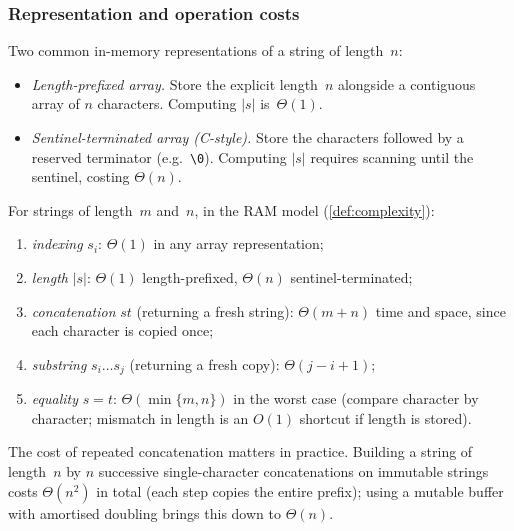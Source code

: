 \subsubsection*{Representation and operation costs}

Two common in-memory representations of a string of length~$n$:
\begin{itemize}
  \item \emph{Length-prefixed array.} Store the explicit length~$n$
        alongside a contiguous array of $n$ characters. Computing
        $|s|$ is~$\Theta(1)$.
  \item \emph{Sentinel-terminated array (C-style).} Store the
        characters followed by a reserved terminator (e.g.\ \texttt{\textbackslash 0}).
        Computing $|s|$ requires scanning until the sentinel, costing
        $\Theta(n)$.
\end{itemize}

\begin{proposition}
\label{prop:string-ops-cost}
For strings of length~$m$ and~$n$, in the RAM model
(\cref{def:complexity}):
\begin{enumerate}[label=(\alph*)]
  \item \emph{indexing} $s_i$: $\Theta(1)$ in any array representation;
  \item \emph{length} $|s|$: $\Theta(1)$ length-prefixed,
        $\Theta(n)$ sentinel-terminated;
  \item \emph{concatenation} $s t$ (returning a fresh string):
        $\Theta(m + n)$ time and space, since each character is copied
        once;
  \item \emph{substring} $s_i \dots s_j$ (returning a fresh copy):
        $\Theta(j - i + 1)$;
  \item \emph{equality} $s = t$: $\Theta(\min\{m, n\})$ in the worst
        case (compare character by character; mismatch in length is an
        $O(1)$ shortcut if length is stored).
\end{enumerate}
\end{proposition}

\begin{remark}
The cost of repeated concatenation matters in practice. Building a
string of length~$n$ by $n$ successive single-character
concatenations on immutable strings costs $\Theta(n^2)$ in total
(each step copies the entire prefix); using a mutable buffer with
amortised doubling brings this down to $\Theta(n)$.
\end{remark}

